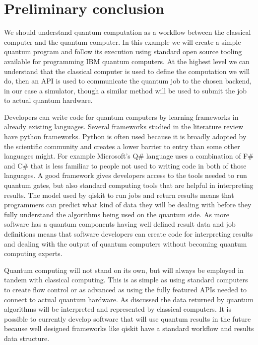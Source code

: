 \documentclass{article}
\begin{document}
\section{Preliminary conclusion}

We should understand quantum computation as a workflow between the classical computer and the quantum computer. In this example we will create a simple quantum program and follow its execution using standard open source tooling available for programming IBM quantum computers. At the highest level we can understand that the classical computer is used to define the computation we will do, then an API is used to communicate the quantum job to the chosen backend, in our case a simulator, though a similar method will be used to submit the job to actual quantum hardware.


Developers can write code for quantum computers by learning frameworks in already existing languages. Several frameworks studied in the literature review have python frameworks. Python is often used because it is broadly adopted by the scientific community and creates a lower barrier to entry than some other languages might. For example Microsoft's Q\# language uses a combination of F\# and C\# that is less familiar to people not used to writing code in both of those languages. A good framework gives developers access to the tools needed to run quantum gates, but also standard computing tools that are helpful in interpreting results. The model used by qiskit to run jobs and return results means that programmers can predict what kind of data they will be dealing with before they fully understand the algorithms being used on the quantum side. As more software has a quantum components having well defined result data and job definitions means that software developers can create code for interpreting results and dealing with the output of quantum computers without becoming quantum computing experts.

Quantum computing will not stand on its own, but will always be employed in tandem with classical computing. This is as simple as using standard computers to create flow control or as advanced as using the fully featured APIs needed to connect to actual quantum hardware. As discussed the data returned by quantum algorithms will be interpreted and represented by classical computers. It is possible to currently develop software that will use quantum results in the future because well designed frameworks like qiskit have a standard workflow and results data structure.
\end{document}
